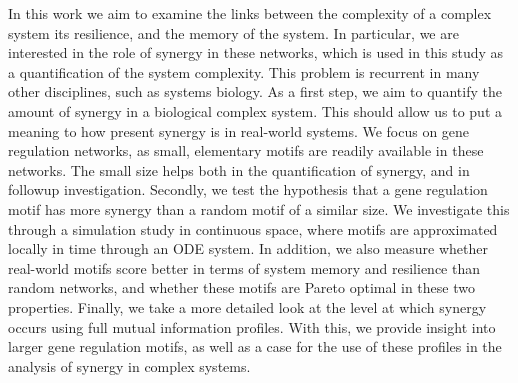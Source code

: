 \documentclass[../main.tex]{subfiles}
\begin{document}
In this work we aim to examine the links between the complexity of a complex system its resilience, and the memory of the system.
In particular, we are interested in the role of synergy in these networks, which is used in this study as a quantification of the system complexity.
This problem is recurrent in many other disciplines, such as systems biology.
As a first step, we aim to quantify the amount of synergy in a biological complex system.
This should allow us to put a meaning to how present synergy is in real-world systems.
We focus on gene regulation networks, as small, elementary motifs are readily available in these networks.
The small size helps both in the quantification of synergy, and in followup investigation.
Secondly, we test the hypothesis that a gene regulation motif has more synergy than a random motif of a similar size. 
We investigate this through a simulation study in continuous space, where motifs are approximated locally in time through an ODE system.
In addition, we also measure whether real-world motifs score better in terms of system memory and resilience than random networks, and whether these motifs are Pareto optimal in these two properties.
Finally, we take a more detailed look at the level at which synergy occurs using full mutual information profiles.
With this, we provide insight into larger gene regulation motifs, as well as a case for the use of these profiles in the analysis of synergy in complex systems.


\def\biblio{}
\end{document}
